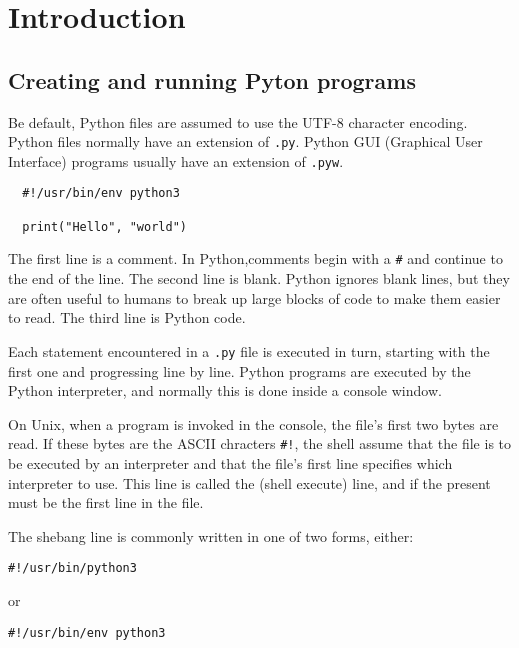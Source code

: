 
\chapter{Introduction}

\section{Creating and running Pyton programs}

Be default, Python files are assumed to use the UTF-8 character encoding.
Python files normally have an extension of \verb|.py|.
Python GUI (Graphical User Interface) programs usually have an extension of \verb|.pyw|.



\begin{lstlisting}
  #!/usr/bin/env python3

  print("Hello", "world")
\end{lstlisting}



The first line is a comment.
In Python,comments begin with a \verb|#| and continue to the end of the line.
The second line is blank.
Python ignores blank lines, but they are often useful to humans to break up large blocks of code to make them easier to read.
The third line is Python code.


Each statement encountered in a \verb|.py| file is executed in turn, starting with the first one and progressing line by line.
Python programs are executed by the Python interpreter, and normally this is done inside a console window.



On Unix, when a program is invoked in the console, the file's first two bytes are read.
If these bytes are the ASCII chracters \verb|#!|, the shell assume that the file is to be executed by an interpreter and that the file's first line specifies which interpreter to use.
This line is called the  (shell execute) line, and if the present must be the first line in the file.



The shebang line is commonly written in one of two forms, either:
\begin{lstlisting}
#!/usr/bin/python3  
\end{lstlisting}

or

\begin{lstlisting}
#!/usr/bin/env python3  
\end{lstlisting}


